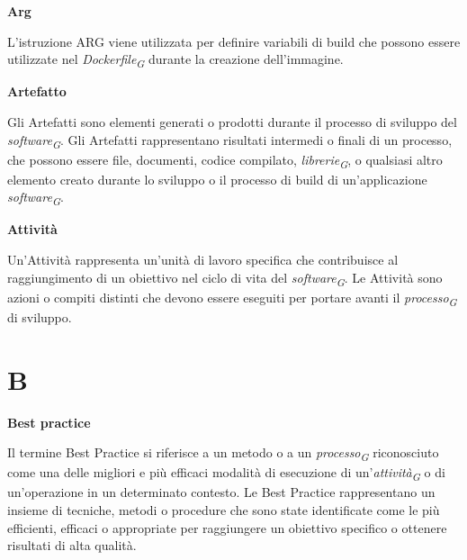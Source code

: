 \documentclass{article}
\begin{document}
\textbf{Arg}

\vspace{0.1cm}

L’istruzione ARG viene utilizzata per definire variabili di build che possono essere utilizzate nel \textit{Dockerfile}\textsubscript{\textit{G}} durante la creazione dell'immagine. 

\vspace{0.4cm}

\textbf{Artefatto}

\vspace{0.1cm}

Gli Artefatti sono elementi generati o prodotti durante il processo di sviluppo del \textit{software}\textsubscript{\textit{G}}. Gli Artefatti rappresentano risultati intermedi o finali di un processo, che possono essere file, documenti, codice compilato, \textit{librerie}\textsubscript{\textit{G}}, o qualsiasi altro elemento creato durante lo sviluppo o il processo di build di un'applicazione \textit{software}\textsubscript{\textit{G}}.

\vspace{0.4cm}

\textbf{Attività}

\vspace{0.1cm}

Un'Attività rappresenta un'unità di lavoro specifica che contribuisce al raggiungimento di un obiettivo nel ciclo di vita del \textit{software}\textsubscript{\textit{G}}. Le Attività sono azioni o compiti distinti che devono essere eseguiti per portare avanti il \textit{processo}\textsubscript{\textit{G}} di sviluppo.

\pagebreak
\section*{B}

\vspace{0.4cm}
\textbf{Best practice}

\vspace{0.1cm}

Il termine Best Practice si riferisce a un metodo o a un \textit{processo}\textsubscript{\textit{G}} riconosciuto come una delle migliori e più efficaci modalità di esecuzione di un'\textit{attività}\textsubscript{\textit{G}} o di un'operazione in un determinato contesto. Le Best Practice rappresentano un insieme di tecniche, metodi o procedure che sono state identificate come le più efficienti, efficaci o appropriate per raggiungere un obiettivo specifico o ottenere risultati di alta qualità.
\end{document}
